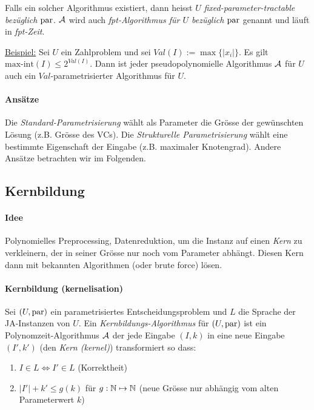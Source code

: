 Falls ein solcher Algorithmus existiert, dann heisst $U$ \emph{fixed-parameter-tractable bezüglich $\text{par}$}.
$\mathcal{A}$ wird auch \emph{fpt-Algorithmus für $U$ bezüglich $\text{par}$} genannt und läuft in \emph{fpt-Zeit}.

\underline{Beispiel:}
Sei $U$ ein Zahlproblem und sei $Val(I) := \max \{ |x_i| \}$.
Es gilt $\text{max-int}(I) \leq 2^{Val(I)}$.
Dann ist jeder pseudopolynomielle Algorithmus $\mathcal{A}$ für $U$ auch ein $Val$-parametrisierter Algorithmus für $U$.

\paragraph{Ansätze}
Die \emph{Standard-Parametrisierung} wählt als Parameter die Grösse der gewünschten Lösung (z.B. Grösse des VCs).
Die \emph{Strukturelle Parametrisierung} wählt eine bestimmte Eigenschaft der Eingabe (z.B. maximaler Knotengrad).
Andere Ansätze betrachten wir im Folgenden.


\subsection{Kernbildung}

\paragraph{Idee}
Polynomielles Preprocessing, Datenreduktion, um die Instanz auf einen \emph{Kern} zu verkleinern,
der in seiner Grösse nur noch vom Parameter abhängt.
Diesen Kern dann mit bekannten Algorithmen (oder brute force) lösen.

\paragraph{Kernbildung (kernelisation)}
Sei $(U, \text{par})$ ein parametrisiertes Entscheidungsproblem und $L$ die Sprache der JA-Instanzen von $U$.
Ein \emph{Kernbildungs-Algorithmus} für $(U, \text{par})$ ist ein Polynomzeit-Algorithmus $\mathcal{A}$ der jede Eingabe $(I, k)$
in eine neue Eingabe $(I', k')$ (den \emph{Kern (kernel)}) transformiert so dass:
\begin{enumerate}[label=(\roman*)]
    \item $ I \in L \iff I' \in L $ (Korrektheit)
    \item $ |I'| + k' \leq g(k) $ für $g : \mathbb{N} \mapsto \mathbb{N}$ (neue Grösse nur abhängig vom alten Parameterwert $k$)
\end{enumerate}

